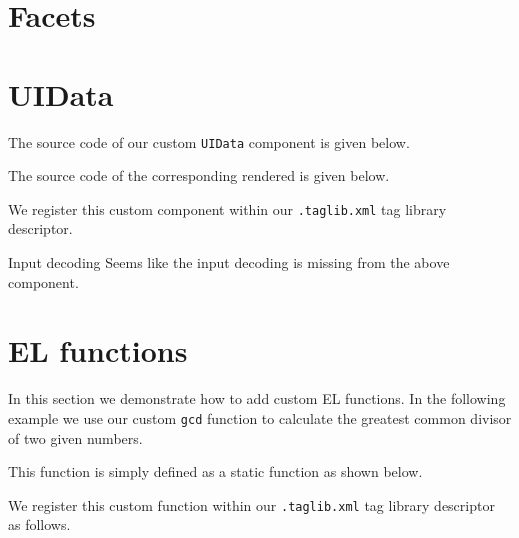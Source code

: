 \section{Facets}

\section{UIData}
The source code of our custom \texttt{UIData} component is given below.


The source code of the corresponding rendered is given below.


We register this custom component within our \texttt{.taglib.xml} tag library descriptor.


\begin{TODO}{Input decoding}
	Seems like the input decoding is missing from the above component.
\end{TODO}


\section{EL functions}
In this section we demonstrate how to add custom EL functions.
In the following example we use our custom \texttt{gcd} function to calculate the greatest common divisor of two given numbers.


This function is simply defined as a static function as shown below.


We register this custom function within our \texttt{.taglib.xml} tag library descriptor as follows.

